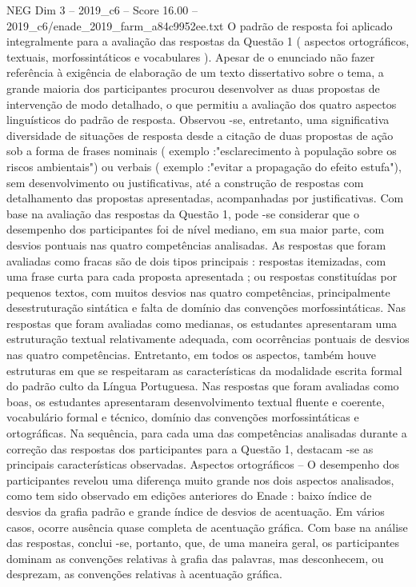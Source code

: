 \begin{textsample}{NEG Dim 3 – 2019\_c6 – Score 16.00 – 2019\_c6/enade\_2019\_farm\_a84c9952ee.txt}
O padrão de resposta foi aplicado integralmente para a avaliação das respostas da Questão 1 ( aspectos ortográficos, textuais, morfossintáticos e vocabulares ).
Apesar de o enunciado não fazer referência à exigência de elaboração de um texto dissertativo sobre o tema, a grande maioria dos participantes procurou desenvolver as duas propostas de intervenção de modo detalhado, o que permitiu a avaliação dos quatro aspectos linguísticos do padrão de resposta.
Observou -se, entretanto, uma significativa diversidade de situações de resposta desde a citação de duas propostas de ação sob a forma de frases nominais ( exemplo :"esclarecimento à população sobre os riscos ambientais") ou verbais ( exemplo :"evitar a propagação do efeito estufa"), sem desenvolvimento ou justificativas, até a construção de respostas com detalhamento das propostas apresentadas, acompanhadas por justificativas.
Com base na avaliação das respostas da Questão 1, pode -se considerar que o desempenho dos participantes foi de nível mediano, em sua maior parte, com desvios pontuais nas quatro competências analisadas.
As respostas que foram avaliadas como fracas são de dois tipos principais : respostas itemizadas, com uma frase curta para cada proposta apresentada ; ou respostas constituídas por pequenos textos, com muitos desvios nas quatro competências, principalmente desestruturação sintática e falta de domínio das convenções morfossintáticas.
Nas respostas que foram avaliadas como medianas, os estudantes apresentaram uma estruturação textual relativamente adequada, com ocorrências pontuais de desvios nas quatro competências.
Entretanto, em todos os aspectos, também houve estruturas em que se respeitaram as características da modalidade escrita formal do padrão culto da Língua Portuguesa.
Nas respostas que foram avaliadas como boas, os estudantes apresentaram desenvolvimento textual fluente e coerente, vocabulário formal e técnico, domínio das convenções morfossintáticas e ortográficas.
Na sequência, para cada uma das competências analisadas durante a correção das respostas dos participantes para a Questão 1, destacam -se as principais características observadas.
Aspectos ortográficos – O desempenho dos participantes revelou uma diferença muito grande nos dois aspectos analisados, como tem sido observado em edições anteriores do Enade : baixo índice de desvios da grafia padrão e grande índice de desvios de acentuação.
Em vários casos, ocorre ausência quase completa de acentuação gráfica.
Com base na análise das respostas, conclui -se, portanto, que, de uma maneira geral, os participantes dominam as convenções relativas à grafia das palavras, mas desconhecem, ou desprezam, as convenções relativas à acentuação gráfica.

\end{textsample}
